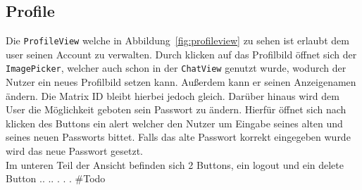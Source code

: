     \subsection{Profile}\label{subsec:profile}
    Die \texttt{ProfileView} welche in Abbildung~\ref{fig:profileview} zu sehen ist erlaubt dem user seinen Account zu verwalten.
    Durch klicken auf das Profilbild öffnet sich der \texttt{ImagePicker}, welcher auch schon in der \texttt{ChatView} genutzt wurde, wodurch der Nutzer ein neues Profilbild setzen kann.
    Außerdem kann er seinen Anzeigenamen ändern.
    Die Matrix ID bleibt hierbei jedoch gleich.
    Darüber hinaus wird dem User die Möglichkeit geboten sein Passwort zu ändern.
    Hierfür öffnet sich nach klicken des Buttons ein alert welcher den Nutzer um Eingabe seines alten und seines neuen Passworts bittet.
    Falls das alte Passwort korrekt eingegeben wurde wird das neue Passwort gesetzt.\\
    Im unteren Teil der Ansicht befinden sich 2 Buttons, ein logout und ein delete Button ..  .. . . .
    \#Todo

